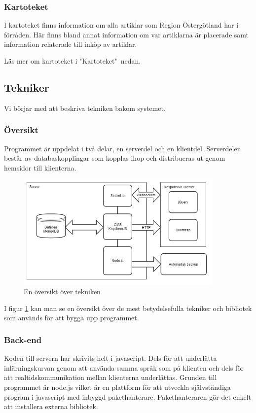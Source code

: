 \subsubsection{Kartoteket}
I kartoteket finns information om alla artiklar som Region Östergötland har i förråden.
Här finns bland annat information om var artiklarna är placerade samt information relaterade till inköp av artiklar.

Läs mer om kartoteket i "Kartoteket"\ nedan.

\subsection{Tekniker}
Vi börjar med att beskriva tekniken bakom systemet.

\subsubsection{Översikt}
Programmet är uppdelat i två delar, en serverdel och en klientdel.
Serverdelen består av databaskopplingar som kopplas ihop och distribueras ut genom hemsidor till klienterna.

\begin{figure}
  \centering
  \includegraphics[width=0.9\textwidth]{images/techoverview.png}
  \caption{En översikt över tekniken}
  \label{fig:techoverview}
\end{figure}

I figur \ref{fig:techoverview} kan man se en översikt över de mest betydelsefulla tekniker och bibliotek som används för att bygga upp programmet.

\subsubsection{Back-end}
Koden till servern har skrivits helt i javascript.
Dels för att underlätta inlärningskurvan genom att använda samma språk som på klienten och dels för att realtidskommunikation mellan klienterna underlättas.
Grunden till programmet är node.js vilket är en plattform för att utveckla självständiga program i javascript med inbyggd pakethanterare.
Pakethanteraren gör det enkelt att installera externa bibliotek.

